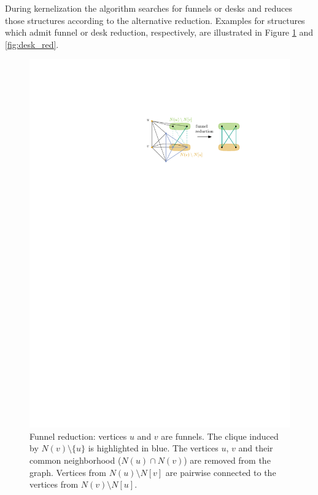 \documentclass[12pt,a4paper,twoside]{scrartcl}
\numberwithin{equation}{section}
\begin{document}
During kernelization the algorithm searches for funnels or desks and reduces those structures according to the alternative reduction. Examples for structures which admit funnel or desk reduction, respectively, are illustrated in Figure \ref{fig:funnel_red} and \ref{fig:desk_red}.


\begin{figure}[htb]
	\captionsetup{belowskip=0em}
	\includegraphics[scale=1.5]{images/funnel_red}
	\centering
	\caption{Funnel reduction: vertices $u$ and $v$ are funnels. The clique induced by $N(v)\setminus\{u\}$ is highlighted in blue. The vertices $u$, $v$ and their common neighborhood ($N(u)\cap N(v)$) are removed from the graph. Vertices from $N(u)\setminus N[v]$ are pairwise connected to the vertices from $N(v)\setminus N[u]$.}
	\label{fig:funnel_red}
\end{figure}
\end{document}
